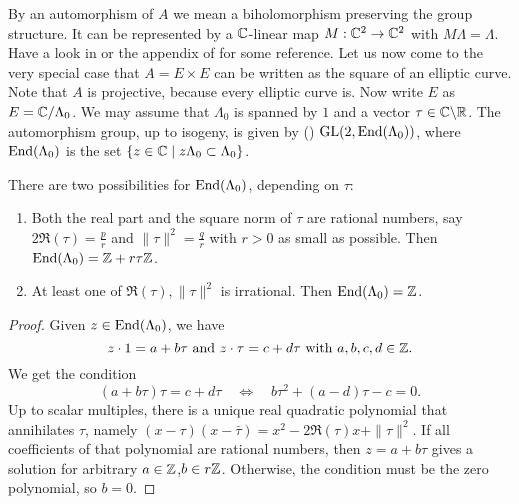 By an automorphism of $A$ we mean a biholomorphism preserving the group structure. It can be represented by a $\mathbb{C}$-linear map $ M:\mathbb{C}^2 \rightarrow \mathbb{C}^2$ with $M\Lambda =\Lambda$. Have a look in \cite{Fujiki} or the appendix of \cite{Ghys} for some reference.
Let us now come to the very special case that $A=E\times E$ can be written as the square of an elliptic curve. Note that $A$ is projective, because every elliptic curve is. 
Now write $E$ as $E=\mathbb{C}/\Lambda_0$. We may assume that $\Lambda_0 $ is spanned by $1$ and a vector $\tau\in\mathbb{C}\backslash\mathbb{R}$. The automorphism group, up to isogeny, is given by (\cite{Ghys})
$\operatorname{GL}(2,\operatorname{End}(\Lambda_0))$, where
$\operatorname{End}(\Lambda_0)$ is the set $\{z\in\mathbb{C} \;|\; z\Lambda_0\subset \Lambda_0\}$.
\begin{proposition} There are two possibilities for $\operatorname{End}(\Lambda_0)$, depending on $\tau$:
\begin{enumerate}
 \item Both the real part and the square norm of $\tau$ are rational numbers, say $2\Re(\tau) = \frac{p}{r}$ and $\|\tau\|^2 = \frac{q}{r}$ with $r>0$ as small as possible. Then $\operatorname{End}(\Lambda_0)= \mathbb{Z}+ r\tau\mathbb{Z}$.
 \item At least one of $\Re(\tau), \|\tau\|^2$ is irrational. Then $\operatorname{End}(\Lambda_0)=\mathbb{Z}$.
\end{enumerate}
\end{proposition}
\begin{proof}
Given $z\in\operatorname{End}(\Lambda_0)$, we have $$z\cdot 1 = a + b\tau\text{ and }z\cdot \tau = c+ d\tau\text{ with }a,b,c,d\in \mathbb{Z}.$$ 
We get the condition
$$
(a+b\tau)\tau = c+d\tau\quad \Leftrightarrow \quad b\tau^2 + (a-d)\tau -c =0.
$$
Up to scalar multiples, there is a unique real quadratic polynomial that annihilates $\tau$, namely $ (x -\tau )(x-\bar{\tau})=x^2 - 2\Re(\tau)x+ \|\tau\|^2$. 
If all coefficients of that polynomial are rational numbers, then $z=a+b\tau$ gives a solution for arbitrary $a\in\mathbb{Z}$,$b\in r\mathbb{Z}$. Otherwise, the condition must be the zero polynomial, so $b=0$.
\end{proof}

